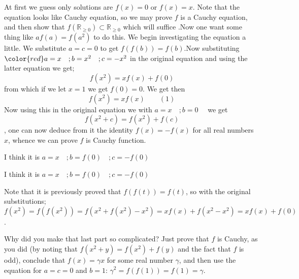\begin{solution}
	\begin{tcolorbox}At first we guess only solutions are $f(x)=0$ or $f(x)=x$. Note that the equation looks like Cauchy equation, so we may prove $f$ is a Cauchy equation, and then show that $f(\mathbb{R}_{\geq0}) \subset \mathbb{R}_{\geq0}$ which will suffice .Now one want some thing like $af(a)=f(a^2)$ to do this. We begin investigating the equation  a little. We substitute $a=c=0$ to get $f(f(b))=f(b)$.Now substituting $\color{red} a=x\quad ;b=x^2 \quad ; c=-x^2$ in the original equation and using the latter equation we get; \[ f(x^2)=xf(x)+f(0)\] from which if we let $x=1$ we get $f(0)=0$. We get then \[f(x^2) = xf(x) \qquad (1)\] Now using this in the original equation we with $a=x \quad;b=0 \quad $ we get \[f(x^2 + c) = f(x^2) + f(c)\], one can now deduce from it the identity $f(x)=-f(x)$ for all real numbers $x$, whence we can prove $f$ is Cauchy function. 
\end{tcolorbox}


I think it is $a=x\quad ;b=f(0)  \quad ; c=-f(0)$
\end{solution}



\begin{solution}
	\begin{tcolorbox}


I think it is $a=x\quad ;b=f(0)  \quad ; c=-f(0)$\end{tcolorbox}

Note that it is previously proved that $f(f(t))= f(t)$, so with the original substitutions; \[f(x^2) = f(f(x^2)) = f(x^2+f(x^2)-x^2) = xf(x) + f(x^2-x^2) = xf(x) + f(0) \].
\end{solution}



\begin{solution}
	Why did you make that last part so complicated? Just prove that $f$ is Cauchy, as you did (by noting that $f(x^2+y) = f(x^2)+f(y)$ and the fact that $f$ is odd), conclude that $f(x) = \gamma x$ for some real number $\gamma$, and then use the equation for $a = c = 0$ and $b = 1$: $\gamma^2 = f(f(1)) = f(1) = \gamma$.
\end{solution}



